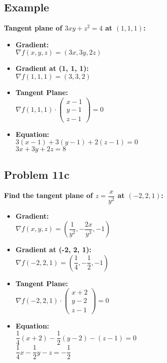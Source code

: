 \documentclass[11pt]{article}
\begin{document}
\begin{multicols}{2}
    \subsection*{Example}
    \textbf{Tangent plane of \( 3xy + z^2 = 4 \) at \((1, 1, 1)\):}
    \begin{itemize}
        \item \textbf{Gradient:} \\
        \( \nabla f(x, y, z) = (3x, 3y, 2z) \)
        \item \textbf{Gradient at (1, 1, 1):} \\
        \( \nabla f(1, 1, 1) = (3, 3, 2) \)
        \item \textbf{Tangent Plane:} \\
        \( \nabla f(1, 1, 1) \cdot \begin{pmatrix}
        x - 1 \\
        y - 1 \\
        z - 1
        \end{pmatrix} = 0 \)
        \item \textbf{Equation:} \\
        \( 3(x - 1) + 3(y - 1) + 2(z - 1) = 0 \) \\
        \( 3x + 3y + 2z = 8 \)
    \end{itemize}
\columnbreak
    \subsection*{Problem 11c}
    \textbf{Find the tangent plane of \( z = \dfrac{x}{y^2} \) at \((-2, 2, 1)\):}
    \begin{itemize}
        \item \textbf{Gradient:} \\
        \( \nabla f(x, y, z) = \left(\dfrac{1}{y^2}, -\dfrac{2x}{y^3}, -1\right) \)
        \item \textbf{Gradient at (-2, 2, 1):} \\
        \( \nabla f(-2, 2, 1) = \left(\dfrac{1}{4}, -\dfrac{1}{2}, -1\right) \)
        \item \textbf{Tangent Plane:} \\
        \( \nabla f(-2, 2, 1) \cdot \begin{pmatrix}
        x + 2 \\
        y - 2 \\
        z - 1
        \end{pmatrix} = 0 \)
        \item \textbf{Equation:} \\
        \( \dfrac{1}{4}(x + 2) - \dfrac{1}{2}(y - 2) - (z - 1) = 0 \) \\
        \( \dfrac{1}{4}x - \dfrac{1}{2}y - z = -\dfrac{1}{2} \)
    \end{itemize}
\end{multicols}
\end{document}
